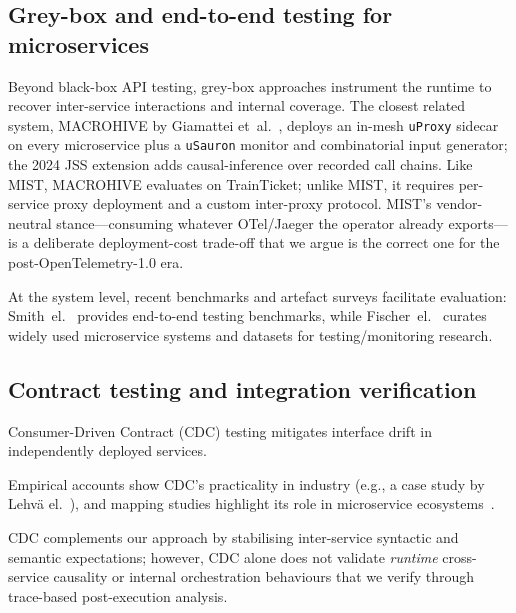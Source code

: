 \documentclass[conference]{IEEEtran}
\begin{document}
\subsection{Grey-box and end-to-end testing for microservices}
Beyond black-box API testing, grey-box approaches instrument the runtime to recover inter-service interactions and internal coverage.
The closest related system, \textsc{MACROHIVE} by Giamattei et~al.~\cite{giamattei2022macrohive,giamattei2024macrohive},
deploys an in-mesh \texttt{uProxy} sidecar on every microservice plus a
\texttt{uSauron} monitor and combinatorial input generator; the 2024
JSS extension adds causal-inference over recorded call chains.  Like
\textsc{MIST}, \textsc{MACROHIVE} evaluates on TrainTicket; unlike
\textsc{MIST}, it requires per-service proxy deployment and a custom
inter-proxy protocol.  \textsc{MIST}'s vendor-neutral stance---consuming
whatever OTel/Jaeger the operator already exports---is a deliberate
deployment-cost trade-off that we argue is the correct one for the
post-OpenTelemetry-1.0 era.

At the system level, recent benchmarks and artefact surveys facilitate evaluation: Smith~el.~\cite{smith2023e2e-benchmark} provides end-to-end testing benchmarks, while Fischer~el.~\cite{fischer2024overview} curates widely used microservice systems and datasets for testing/monitoring research.

\subsection{Contract testing and integration verification}
Consumer-Driven Contract (CDC) testing mitigates interface drift in independently deployed services. 

Empirical accounts show CDC's practicality in industry (e.g., a case study by Lehv{\"a} el.~\cite{lehva2019cdc}), and mapping studies highlight its role in microservice ecosystems~\cite{waseem2020testing}. 

CDC complements our approach by stabilising inter-service syntactic and semantic expectations; however, CDC alone does not validate \emph{runtime} cross-service causality or internal orchestration behaviours that we verify through trace-based post-execution analysis.
\end{document}
